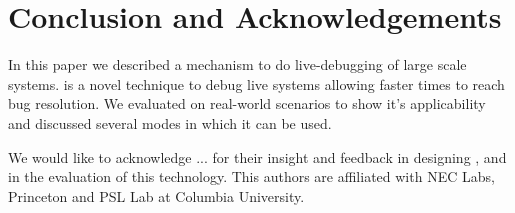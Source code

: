 \section{Conclusion and Acknowledgements}
\label{sec:conclusion}

In this paper we described \parikshan a mechanism to do live-debugging of large scale systems.
\parikshan is a novel technique to debug live systems allowing faster times to reach bug resolution.
We evaluated \parikshan on real-world scenarios to show it's applicability and discussed several modes in which it can be used.

We would like to acknowledge ... for their insight and feedback in designing \parikshan, and in the evaluation of this technology.
This authors are affiliated with NEC Labs, Princeton and PSL Lab at Columbia University. 
